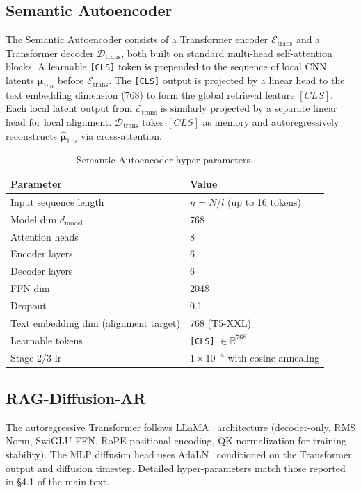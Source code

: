 \documentclass{article}
\begin{document}
\subsection{Semantic Autoencoder}

The Semantic Autoencoder consists of a Transformer encoder $\mathcal{E}_{\text{trans}}$ and a Transformer decoder $\mathcal{D}_{\text{trans}}$, both built on standard multi-head self-attention blocks.
A learnable \texttt{[CLS]} token is prepended to the sequence of local CNN latents $\boldsymbol{\mu}_{1:n}$ before $\mathcal{E}_{\text{trans}}$.
The \texttt{[CLS]} output is projected by a linear head to the text embedding dimension (768) to form the global retrieval feature $[CLS]$.
Each local latent output from $\mathcal{E}_{\text{trans}}$ is similarly projected by a separate linear head for local alignment.
$\mathcal{D}_{\text{trans}}$ takes $[CLS]$ as memory and autoregressively reconstructs $\hat{\boldsymbol{\mu}}_{1:n}$ via cross-attention.

\begin{table}[h]
\centering
\caption{Semantic Autoencoder hyper-parameters.}
\label{tab:sem_ae_arch}
\begin{tabular}{ll}
\toprule
Parameter & Value \\
\midrule
Input sequence length & $n = N/l$ (up to 16 tokens) \\
Model dim $d_{\text{model}}$ & 768 \\
Attention heads & 8 \\
Encoder layers & 6 \\
Decoder layers & 6 \\
FFN dim & 2048 \\
Dropout & 0.1 \\
Text embedding dim (alignment target) & 768 (T5-XXL) \\
Learnable tokens & \texttt{[CLS]} $\in \mathbb{R}^{768}$ \\
Stage-2/3 lr & $1\times10^{-4}$ with cosine annealing \\
\bottomrule
\end{tabular}
\end{table}

\subsection{RAG-Diffusion-AR}

The autoregressive Transformer follows LLaMA~\citep{touvron2023llama} architecture (decoder-only, RMS Norm, SwiGLU FFN, RoPE positional encoding, QK normalization for training stability).
The MLP diffusion head uses AdaLN~\citep{peebles2023scalable} conditioned on the Transformer output and diffusion timestep.
Detailed hyper-parameters match those reported in §4.1 of the main text.
\end{document}
